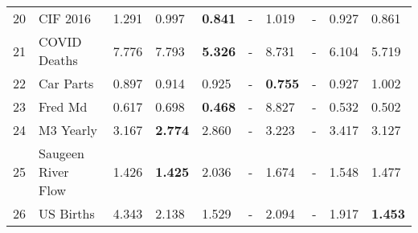\begin{tabular}{llllllllll}
20 & CIF 2016 & 1.291 & 0.997 & \textbf{0.841} & - & 1.019 & - & 0.927 & 0.861 \\
21 & COVID Deaths & 7.776 & 7.793 & \textbf{5.326} & - & 8.731 & - & 6.104 & 5.719 \\
22 & Car Parts & 0.897 & 0.914 & 0.925 & - & \textbf{0.755} & - & 0.927 & 1.002 \\
23 & Fred Md & 0.617 & 0.698 & \textbf{0.468} & - & 8.827 & - & 0.532 & 0.502 \\
24 & M3 Yearly & 3.167 & \textbf{2.774} & 2.860 & - & 3.223 & - & 3.417 & 3.127 \\
25 & Saugeen River Flow & 1.426 & \textbf{1.425} & 2.036 & - & 1.674 & - & 1.548 & 1.477 \\
26 & US Births & 4.343 & 2.138 & 1.529 & - & 2.094 & - & 1.917 & \textbf{1.453} \\
\bottomrule
\end{tabular}
